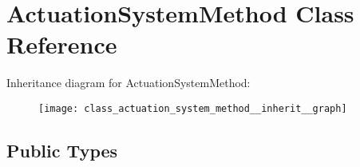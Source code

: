 \hypertarget{class_actuation_system_method}{\section{\-Actuation\-System\-Method \-Class \-Reference}
\label{class_actuation_system_method}
}


\-Inheritance diagram for \-Actuation\-System\-Method\-:
\nopagebreak
\begin{figure}[H]
\begin{center}
\leavevmode
\texttt{[image: class\_actuation\_system\_method\_\_inherit\_\_graph]}
\end{center}
\end{figure}
\subsection*{\-Public \-Types}
